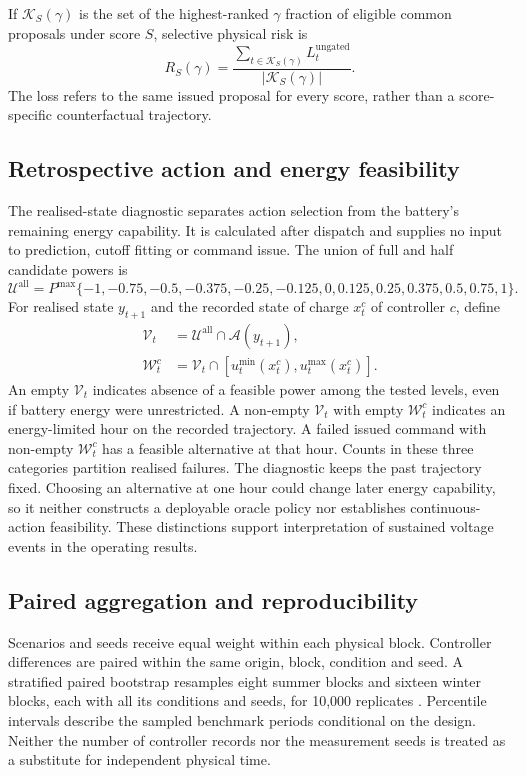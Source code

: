 \documentclass[preprint,12pt]{elsarticle}
\begin{document}
If $\mathcal K_S(\gamma)$ is the set of the highest-ranked $\gamma$ fraction of eligible common proposals under score $S$, selective physical risk is
\begin{equation}
R_S(\gamma)=\frac{\sum_{t\in\mathcal K_S(\gamma)}L_t^{\mathrm{ungated}}}{|\mathcal K_S(\gamma)|}.
\label{eq:selectiverisk}
\end{equation}
The loss refers to the same issued proposal for every score, rather than a score-specific counterfactual trajectory.

\subsection{Retrospective action and energy feasibility}
The realised-state diagnostic separates action selection from the battery's remaining energy capability. It is calculated after dispatch and supplies no input to prediction, cutoff fitting or command issue. The union of full and half candidate powers is
\begin{equation}
\mathcal U^{\mathrm{all}}=P^{\max}\{-1,-0.75,-0.5,-0.375,-0.25,-0.125,0,
0.125,0.25,0.375,0.5,0.75,1\}.
\label{eq:allactions}
\end{equation}
For realised state $y_{t+1}$ and the recorded state of charge $x_t^c$ of controller $c$, define
\begin{align}
\mathcal V_t&=\mathcal U^{\mathrm{all}}\cap\mathcal A(y_{t+1}),\label{eq:physicalalternatives}\\
\mathcal W_t^c&=\mathcal V_t\cap[u_t^{\min}(x_t^c),u_t^{\max}(x_t^c)].\label{eq:energyalternatives}
\end{align}
An empty $\mathcal V_t$ indicates absence of a feasible power among the tested levels, even if battery energy were unrestricted. A non-empty $\mathcal V_t$ with empty $\mathcal W_t^c$ indicates an energy-limited hour on the recorded trajectory. A failed issued command with non-empty $\mathcal W_t^c$ has a feasible alternative at that hour. Counts in these three categories partition realised failures. The diagnostic keeps the past trajectory fixed. Choosing an alternative at one hour could change later energy capability, so it neither constructs a deployable oracle policy nor establishes continuous-action feasibility. These distinctions support interpretation of sustained voltage events in the operating results.

\subsection{Paired aggregation and reproducibility}
Scenarios and seeds receive equal weight within each physical block. Controller differences are paired within the same origin, block, condition and seed. A stratified paired bootstrap resamples eight summer blocks and sixteen winter blocks, each with all its conditions and seeds, for 10,000 replicates \cite{efron}. Percentile intervals describe the sampled benchmark periods conditional on the design. Neither the number of controller records nor the measurement seeds is treated as a substitute for independent physical time.
\end{document}
